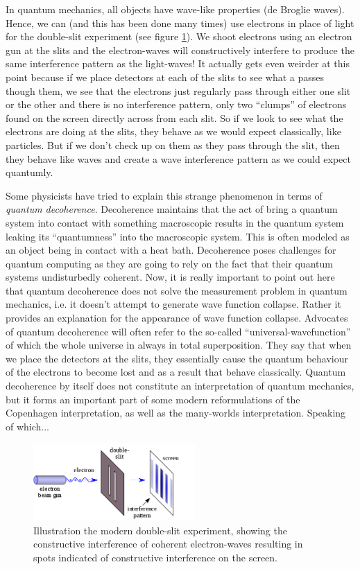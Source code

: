 \documentclass{article}
\begin{document}
In quantum mechanics, all objects have wave-like properties (de Broglie waves). Hence, we can (and this has been done many times) use electrons in place of light for the double-slit experiment (see figure \ref{electron_youngs}). We shoot electrons using an electron gun at the slits and the electron-waves will constructively interfere to produce the same interference pattern as the light-waves! It actually gets even weirder at this point because if we place detectors at each of the slits to see what a passes though them, we see that the electrons just regularly pass through either one slit or the other and there is no interference pattern, only two ``clumps'' of electrons found on the screen directly across from each slit. So if we look to see what the electrons are doing at the slits, they behave as we would expect classically, like particles. But if we don't check up on them as they pass through the slit, then they behave like waves and create a wave interference pattern as we could expect quantumly.

Some physicists have tried to explain this strange phenomenon in terms of \emph{quantum decoherence}. Decoherence maintains that the act of bring a quantum system into contact with something macroscopic results in the quantum system leaking its ``quantumness'' into the macroscopic system. This is often modeled as an object being in contact with a heat bath. Decoherence poses challenges for quantum computing as they are going to rely on the fact that their quantum systems undisturbedly coherent. Now, it is really important to point out here that quantum decoherence does not solve the measurement problem in quantum mechanics, i.e. it doesn't attempt to generate wave function collapse. Rather it provides an explanation for the appearance of wave function collapse. Advocates of quantum decoherence will often refer to the so-called ``universal-wavefunction'' of which the whole universe in always in total superposition. They say that when we place the detectors at the slits, they essentially cause the quantum behaviour of the electrons to become lost and as a result that behave classically. Quantum decoherence by itself does not constitute an interpretation of quantum mechanics, but it forms an important part of some modern reformulations of the Copenhagen interpretation, as well as the many-worlds interpretation. Speaking of which...

\begin{figure}[h]
\centering
\includegraphics[width=0.55\textwidth]{electron_youngs.png}
\caption{Illustration the modern double-slit experiment, showing the constructive interference of coherent electron-waves resulting in spots indicated of constructive interference on the screen.}
\label{electron_youngs}
\end{figure}
\end{document}
